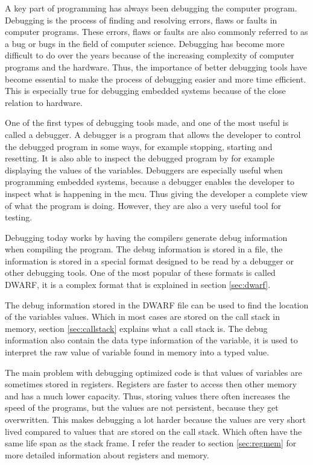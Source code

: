
A key part of programming has always been debugging the computer program.
Debugging is the process of finding and resolving errors, flaws or faults in computer programs.
These errors, flaws or faults are also commonly referred to as a bug or bugs in the field of computer science.
Debugging has become more difficult to do over the years because of the increasing complexity of computer programs and the hardware.
Thus, the importance of better debugging tools have become essential to make the process of debugging easier and more time efficient.
This is especially true for debugging  embedded systems because of the close relation to hardware.


One of the first types of debugging tools made, and one of the most useful is called a debugger.
A debugger is a program that allows the developer to control the debugged program in some ways, for example stopping, starting and resetting.
It is also able to inspect the debugged program by for example displaying the values of the variables.
Debuggers are especially useful when programming embedded systems, because a debugger enables the developer to inspect what is happening in the \gls{mcu}.
Thus giving the developer a complete view of what the program is doing.
However, they are also a very useful tool for testing.


Debugging today works by having the compilers generate debug information when compiling the program.
The debug information is stored in a file, the information is stored in a special format designed to be read by a debugger or other debugging tools.
One of the most popular of these formats is called \gls{DWARF}, it is a complex format that is explained in section \ref{sec:dwarf}.


The debug information stored in the \gls{DWARF} file can be used to find the location of the variables values.
Which in most cases are stored on the call stack in memory, section \ref{sec:callstack} explains what a call stack is.
The debug information also contain the data type information of the variable, it is used to interpret the raw value of variable found in memory into a typed value.


The main problem with debugging optimized code is that values of variables are sometimes stored in registers.
Registers are faster to access then other memory and has a much lower capacity.
Thus, storing values there often increases the speed of the programs, but the values are not persistent, because they get overwritten.
This makes debugging a lot harder because the values are very short lived compared to values that are stored on the call stack.
Which often have the same life span as the stack frame.
I refer the reader to section \ref{sec:regmem} for more detailed information about registers and memory.


